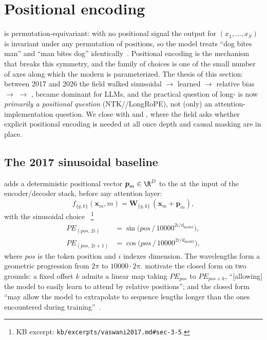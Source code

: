 \section{Positional encoding}
\label{sec:positional-encoding}
\label{sec:position}
\label{sec:positional}

 is permutation-equivariant: with no positional signal the
output for $(x_1, \ldots, x_S)$ is invariant under any permutation of
positions, so the model treats ``dog bites man'' and ``man bites dog'' %
identically~\citep{vaswani2017}. Positional encoding is the mechanism
that breaks this symmetry, and the family of choices is one of the
small number of axes along which the modern  is
parameterized. The thesis of this section: between 2017 and 2026 the
field walked sinusoidal $\to$ learned $\to$  relative bias $\to$
 $\to$ ,  became dominant for  LLMs, and the
practical question of long- is now \emph{primarily a
positional question} (NTK//LongRoPE), not (only) an attention-
implementation question. We close with  and , where the field
asks whether explicit positional encoding is needed at all once depth
and causal masking are in place.

\subsection{The 2017 sinusoidal baseline}
\label{sec:pos-sinusoidal}

\citet{vaswani2017} adds a deterministic positional vector
$\boldsymbol{p}_m \in \R^{D}$ to the  at the input of
the encoder/decoder stack, before any attention layer:
\begin{equation}
f_{\{q,k\}}(\boldsymbol{x}_m, m) = \boldsymbol{W}_{\{q,k\}}\,
   (\boldsymbol{x}_m + \boldsymbol{p}_m),
\label{eq:pe-additive}
\end{equation}
with the sinusoidal choice~\citep[\S 3.5]{vaswani2017}%
\footnote{KB excerpt: \nolinkurl{kb/excerpts/vaswani2017.md#sec-3-5}.}
\begin{equation}
\begin{aligned}
PE_{(pos,\,2i)}     &= \sin\!\bigl(pos\,/\,10000^{2i/d_{\text{model}}}\bigr), \\
PE_{(pos,\,2i+1)}   &= \cos\!\bigl(pos\,/\,10000^{2i/d_{\text{model}}}\bigr),
\end{aligned}
\label{eq:pe-sinusoidal}
\end{equation}
where $pos$ is the token position and $i$ indexes dimension. The
wavelengths form a geometric progression from $2\pi$ to
$10000 \cdot 2\pi$. \citet{vaswani2017} motivate the closed form on two
grounds: a fixed offset $k$ admits a linear map taking $PE_{pos}$ to
$PE_{pos+k}$, ``[allowing] the model to easily learn to attend by
relative positions''; and the closed form ``may allow the model to
extrapolate to sequence lengths longer than the ones encountered during
training''~\citep[\S 3.5]{vaswani2017}.

